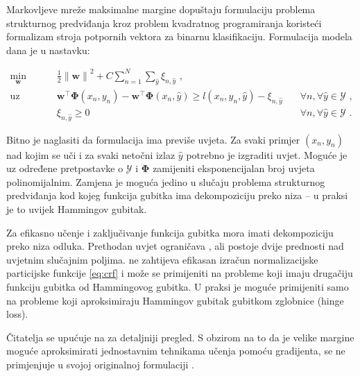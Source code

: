 Markovljeve mreže maksimalne margine  dopuštaju formulaciju problema strukturnog predviđanja kroz
problem kvadratnog programiranja  koristeći
formalizam stroja potpornih vektora za binarnu klasifikaciju. Formulacija
modela \mmmm{} dana je u nastavku:

\begin{equation}\label{eq:mmmm}
\begin{aligned}
  \min_{\mathbf{w}} & \quad \frac{1}{2} {\lVert\mathbf{w}\lVert}^2 + C \sum_{n=1}^{N}\sum_{\hat{y}} \xi_{n,\hat{y}} \text{ ,}              & \\
  \text{uz uvjete}  & \quad \mathbf{w}^\top \mathbf{\Phi}(x_n, y_n) - \mathbf{w}^\top \mathbf{\Phi}(x_n, \hat{y}) \ge l(x_n, y_n, \hat{y}) - \xi_{n,\hat{y}} & \quad \forall n, \forall \hat{y} \in \mathcal{Y} \text{ ,}\\
                    & \quad \xi_{n,\hat{y}} \ge 0                                                                                          & \quad \forall n, \forall \hat{y} \in \mathcal{Y} \text{ .}
\end{aligned}
\end{equation}

\noindent
Bitno je naglasiti da formulacija \mmmm{} ima previše uvjeta. Za svaki primjer
$(x_n, y_n)$ nad kojim se uči i za svaki netočni izlaz $\hat{y}$ potrebno je
izgraditi uvjet. Moguće je uz određene pretpostavke o $\mathcal{Y}$ i
$\mathbf{\Phi}$ zamijeniti eksponencijalan broj uvjeta polinomijalnim. Zamjena
je moguća jedino u slučaju problema strukturnog predviđanja kod kojeg funkcija
gubitka ima dekompoziciju preko niza -- u praksi je to uvijek Hammingov gubitak.

Za efikasno učenje i zaključivanje funkcija gubitka mora imati dekompoziciju
preko niza odluka. Prethodan uvjet ograničava \mmmm{}, ali postoje dvije
prednosti nad uvjetnim slučajnim poljima. \mmmm{} ne zahtijeva efikasan izračun
normalizacijske particijske funkcije \ref{eq:crf} i može se primijeniti na
probleme koji imaju drugačiju funkciju gubitka od Hammingovog gubitka. U praksi je
moguće primijeniti \mmmm{} samo na probleme koji aproksimiraju Hammingov gubitak
gubitkom zglobnice \engl(hinge loss).

Čitatelja se upućuje na \citep{taskar2003maximum} za detaljniji pregled. S
obzirom na to da je velike margine moguće aproksimirati jednostavnim tehnikama
učenja pomoću gradijenta, \mmmm{} se ne primjenjuje u svojoj originalnoj
formulaciji \citep{daume2005learning, ratliff2006maximum}.
